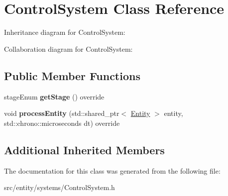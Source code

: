 \hypertarget{classControlSystem}{\section{Control\-System Class Reference}
\label{classControlSystem}
}


Inheritance diagram for Control\-System\-:


Collaboration diagram for Control\-System\-:
\subsection*{Public Member Functions}
\begin{DoxyCompactItemize}
\item 
\hypertarget{classControlSystem_a0be51ba9211cc5880e2253a64901eb86}{stage\-Enum {\bfseries get\-Stage} () override}\label{classControlSystem_a0be51ba9211cc5880e2253a64901eb86}

\item 
\hypertarget{classControlSystem_a76dd5a8441e30282cc5e1fcacbecf340}{void {\bfseries process\-Entity} (std\-::shared\-\_\-ptr$<$ \hyperlink{classEntity}{Entity} $>$ entity, std\-::chrono\-::microseconds dt) override}\label{classControlSystem_a76dd5a8441e30282cc5e1fcacbecf340}

\end{DoxyCompactItemize}
\subsection*{Additional Inherited Members}


The documentation for this class was generated from the following file\-:\begin{DoxyCompactItemize}
\item 
src/entity/systems/Control\-System.\-h\end{DoxyCompactItemize}
